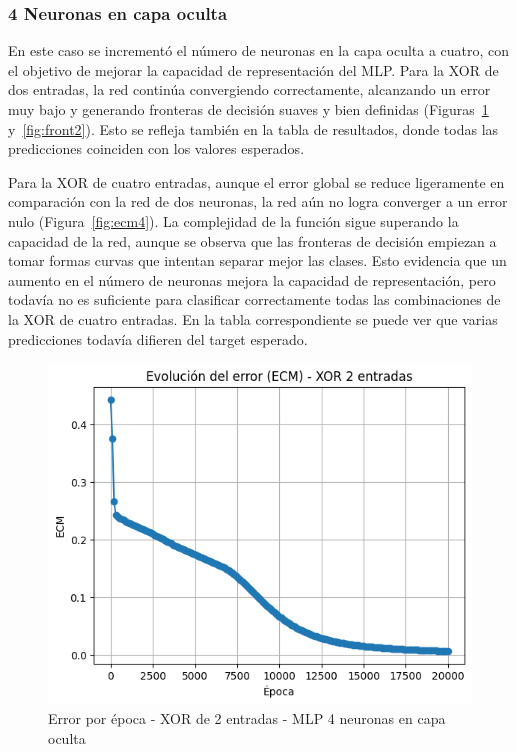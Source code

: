 \documentclass[11pt]{article} %
\begin{document}
\clearpage

\subsubsection{4 Neuronas en capa oculta}

En este caso se incrementó el número de neuronas en la capa oculta a cuatro, con el objetivo de mejorar la capacidad de representación del MLP.
Para la XOR de dos entradas, la red continúa convergiendo correctamente, alcanzando un error muy bajo y generando fronteras de decisión suaves y bien definidas (Figuras~\ref{fig:ecm2} y~\ref{fig:front2}).
Esto se refleja también en la tabla de resultados, donde todas las predicciones coinciden con los valores esperados.

Para la XOR de cuatro entradas, aunque el error global se reduce ligeramente en comparación con la red de dos neuronas, la red aún no logra converger a un error nulo (Figura~\ref{fig:ecm4}).
La complejidad de la función sigue superando la capacidad de la red, aunque se observa que las fronteras de decisión empiezan a tomar formas curvas que intentan separar mejor las clases.
Esto evidencia que un aumento en el número de neuronas mejora la capacidad de representación, pero todavía no es suficiente para clasificar correctamente todas las combinaciones de la XOR de cuatro entradas.
En la tabla correspondiente se puede ver que varias predicciones todavía difieren del target esperado.


\begin{figure}[htbp!]
	\centering
	\includegraphics[width=0.7\linewidth]{"../imgs/ej3/4 neur int/ecm2"}
	\caption{Error por época - XOR de 2 entradas - MLP 4 neuronas en capa oculta}
	\label{fig:ecm2}
\end{figure}
\end{document}
